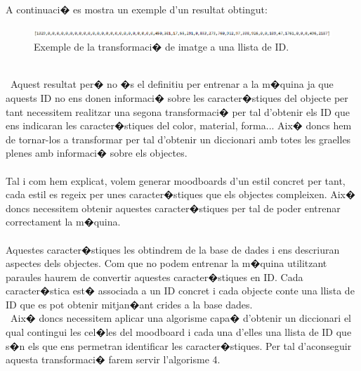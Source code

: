 \documentclass[12pt,a4paper,openright,oneside]{article}
\numberwithin{equation}{section}
\theoremstyle{definition}
\begin{document}
A continuaci� es mostra un exemple d'un resultat obtingut:
\begin{figure}[h!]
\begin{center}
\includegraphics[width=\textwidth]{id}
\caption{Exemple de la transformaci� de imatge a una llista de ID.}
\end{center}
\end{figure}
\\\
Aquest resultat per� no �s el definitiu per entrenar a la m�quina ja que aquests ID no ens donen informaci� sobre les caracter�stiques del objecte per tant necessitem realitzar una segona transformaci� per tal d'obtenir els ID que ens indicaran les caracter�stiques del color, material, forma... Aix� doncs hem de tornar-los a transformar per tal d'obtenir un diccionari amb totes les graelles plenes amb informaci� sobre els objectes. \\\\
Tal i com hem explicat, volem generar moodboards d'un estil concret per tant, cada estil es regeix per unes caracter�stiques que els objectes compleixen. Aix� doncs necessitem obtenir aquestes caracter�stiques per tal de poder entrenar correctament la m�quina.\\\\
Aquestes caracter�stiques les obtindrem de la base de dades i ens descriuran aspectes dels objectes. Com que no podem entrenar la m�quina utilitzant paraules haurem de convertir aquestes caracter�stiques en ID. Cada caracter�stica est� associada a un ID concret i cada objecte conte una llista de ID que es pot obtenir mitjan�ant crides a la base dades.
\\\ Aix� doncs necessitem aplicar una algorisme capa� d'obtenir un diccionari el qual contingui les cel�les del moodboard i cada una d'elles una llista de ID que s�n els que ens permetran identificar les caracter�stiques. Per tal d'aconseguir aquesta transformaci� farem servir l'algorisme 4.
\end{document}
